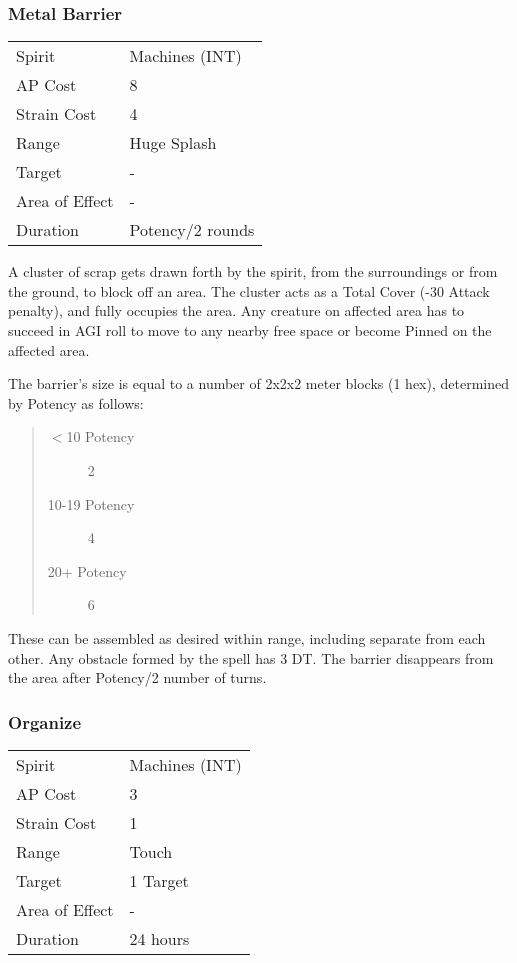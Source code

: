 \documentclass[11pt,a4paper,twocolumn]{book}
\begin{document}
\subsubsection*{Metal Barrier}
{
	\begin{tabu} to 70mm{| X[l,4] | X[l,7] |}
		\hline
		Spirit         & Machines (INT)   \\
		AP Cost        & 8                \\
		Strain Cost    & 4                \\
		Range          & Huge Splash      \\
		Target         & -                \\
		Area of Effect & -                \\
		Duration       & Potency/2 rounds \\ \hline
	\end{tabu}
	
}

\medskip

A cluster of scrap gets drawn forth by the spirit, from the surroundings or from the ground, to block off an area. The cluster acts as a Total Cover (-30 Attack penalty), and fully occupies the area. Any creature on affected area has to succeed in AGI roll to move to any nearby free space or become Pinned on the affected area. 

The barrier's size is equal to a number of 2x2x2 meter blocks (1 hex), determined by Potency as follows: 
\begin{quote}
	\begin{description}
		\item[$<$10 Potency] 	2
		\item[10-19 Potency] 	4
		\item[20+ Potency]  	6
	\end{description}	
\end{quote}

These can be assembled as desired within range, including separate from each other. Any obstacle formed by the spell has 3 DT. The barrier disappears from the area after Potency/2 number of turns.

\subsubsection*{Organize}
{
	\begin{tabu} to 70mm{| X[l,4] | X[l,7] |}
		\hline
		Spirit         & Machines (INT)  \\
		AP Cost        & 3               \\
		Strain Cost    & 1               \\
		Range          & Touch               \\
		Target         & 1 Target           \\
		Area of Effect & -               \\
		Duration       & 24 hours \\ \hline
	\end{tabu}
	
}
\end{document}
